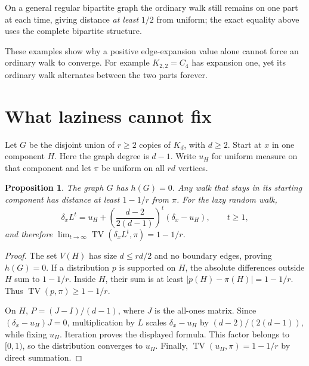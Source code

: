 \documentclass[11pt,letterpaper]{article}
\newtheorem{proposition}{Proposition}
\newcommand{\TV}{\operatorname{TV}}
\begin{document}
On a general regular bipartite graph the ordinary walk still remains on
one part at each time, giving distance \emph{at least} $1/2$ from uniform;
the exact equality above uses the complete bipartite structure.

These examples show why a positive edge-expansion value alone cannot force
an ordinary walk to converge. For example $K_{2,2}=C_4$ has expansion one,
yet its ordinary walk alternates between the two parts forever.

\newpage
\section{What laziness cannot fix}
Let $G$ be the disjoint union of $r\ge2$ copies of $K_d$, with $d\ge2$.
Start at $x$ in one component $H$. Here the graph degree is $d-1$.
Write $u_H$ for uniform measure on that component and let $\pi$ be uniform
on all $rd$ vertices.

\begin{proposition}\label{prop:disconnected}
The graph $G$ has $h(G)=0$. Any walk that stays in its starting component
has distance at least $1-1/r$ from $\pi$. For the lazy random walk,
\[
 \delta_xL^t=u_H+
 \left(\frac{d-2}{2(d-1)}\right)^t(\delta_x-u_H),\qquad t\ge1,
\]
and therefore $\lim_{t\to\infty}\TV(\delta_xL^t,\pi)=1-1/r$.
\end{proposition}
\begin{proof}
The set $V(H)$ has size $d\le rd/2$ and no boundary edges, proving
$h(G)=0$. If a distribution $p$ is supported on $H$, the absolute
differences outside $H$ sum to $1-1/r$. Inside $H$, their sum is at least
$|p(H)-\pi(H)|=1-1/r$. Thus $\TV(p,\pi)\ge1-1/r$.

On $H$, $P=(J-I)/(d-1)$, where $J$ is the all-ones matrix.
Since $(\delta_x-u_H)J=0$, multiplication by $L$ scales
$\delta_x-u_H$ by $(d-2)/(2(d-1))$, while fixing $u_H$.
Iteration proves the displayed formula. This factor belongs to $[0,1)$,
so the distribution converges to $u_H$. Finally,
$\TV(u_H,\pi)=1-1/r$ by direct summation.
\end{proof}
\end{document}
